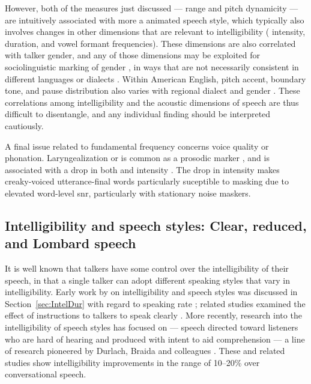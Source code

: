 However, both of the measures just discussed — \fo{} range and pitch dynamicity — are intuitively associated with more a animated speech style, which typically also involves changes in other dimensions that are relevant to intelligibility (\viz{} intensity, duration, and vowel formant frequencies).  These dimensions are also correlated with talker gender, and any of those dimensions may be exploited for sociolinguistic marking of gender \citep[see, \eg][]{McconnellGinet1978}, in ways that are not necessarily consistent in different languages or dialects \citep[\eg][]{Yuasa2008}.  Within American English, pitch accent, boundary tone, and pause distribution also varies with regional dialect and gender \citep{ClopperSmiljanic2011}.  These correlations among intelligibility and the acoustic dimensions of speech are thus difficult to disentangle, and any individual finding should be interpreted cautiously.

A final issue related to fundamental frequency concerns voice quality or phonation.  Laryngealization or  is common as a prosodic marker \citep{Lehiste1979, Kreiman1982, DilleyEtAl1996}, and is associated with a drop in both \fo{} and intensity \citep{GordonLadefoged2001}.  The drop in intensity makes creaky-voiced utterance-final words particularly suceptible to masking due to elevated word-level \ac{snr}, particularly with stationary noise maskers.


\subsection[Intelligibility and speech styles]{Intelligibility and speech styles: Clear, reduced, and Lombard speech}
It is well known that talkers have some control over the intelligibility of their speech, in that a single talker can adopt different speaking styles that vary in intelligibility.  Early work by \citeauthor{Tolhurst1957a} on intelligibility and speech styles was discussed in Section~\ref{sec:IntelDur} with regard to speaking rate \citep{Tolhurst1957a}; related studies examined the effect of instructions to talkers to speak clearly \citep{Tolhurst1954, Tolhurst1955}.  More recently, research into the intelligibility of speech styles has focused on  — speech directed toward listeners who are hard of hearing and produced with intent to aid comprehension — a line of research pioneered by Durlach, Braida and colleagues \citep[\eg][]{PichenyEtAl1985, PichenyEtAl1986, PichenyEtAl1989, UchanskiEtAl1996, KrauseBraida2004}.  These and related studies show intelligibility improvements in the range of 10–20\% over conversational speech.

